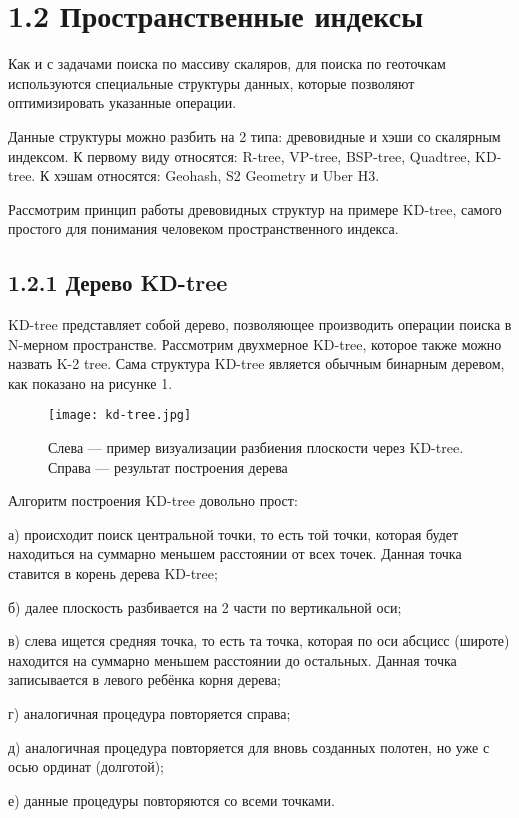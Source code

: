 \section{1.2 Пространственные индексы}
Как и с задачами поиска по массиву скаляров, для поиска по геоточкам используются специальные структуры данных, которые позволяют оптимизировать указанные операции. 

Данные структуры можно разбить на 2 типа: древовидные и хэши со скалярным индексом. К первому виду относятся: R-tree, VP-tree, BSP-tree, Quadtree, KD-tree. К хэшам относятся: Geohash, S2 Geometry и Uber H3.

Рассмотрим принцип работы древовидных структур на примере KD-tree, самого простого для понимания человеком пространственного индекса.

\subsection{1.2.1 Дерево KD-tree}
KD-tree представляет собой дерево, позволяющее производить операции поиска в N-мерном пространстве. Рассмотрим двухмерное KD-tree, которое также можно назвать K-2 tree.
Сама структура KD-tree является обычным бинарным деревом, как показано на рисунке 1.
\par\vspace{1em}
\begin{figure}[H]
    \centering
    \texttt{[image: kd-tree.jpg]}
    \caption{Слева — пример визуализации разбиения плоскости через KD-tree. Справа --- результат построения дерева}
\end{figure}

Алгоритм построения KD-tree довольно прост\cite{nnq}:
\par а) происходит поиск центральной точки, то есть той точки, которая будет находиться на суммарно меньшем расстоянии от всех точек. Данная точка ставится в корень дерева KD-tree;
\par б) далее плоскость разбивается на 2 части по вертикальной оси;
\par в) слева ищется средняя точка, то есть та точка, которая по оси абсцисс (широте) находится на суммарно меньшем расстоянии до остальных. Данная точка записывается в левого ребёнка корня дерева;
\par г) аналогичная процедура повторяется справа;
\par д) аналогичная процедура повторяется для вновь созданных полотен, но уже с осью ординат (долготой);
\par е) данные процедуры повторяются со всеми точками.

